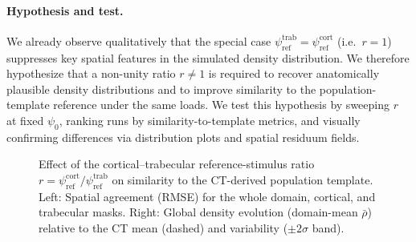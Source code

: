\paragraph{Hypothesis and test.}
We already observe qualitatively that the special case $\psi_{\mathrm{ref}}^{\mathrm{trab}}=\psi_{\mathrm{ref}}^{\mathrm{cort}}$ (i.e.\ $r=1$) suppresses key spatial features in the simulated density distribution.
We therefore hypothesize that a non-unity ratio $r\neq 1$ is required to recover anatomically plausible density distributions and to improve similarity to the population-template reference under the same loads.
We test this hypothesis by sweeping $r$ at fixed $\psi_0$, ranking runs by similarity-to-template metrics, and visually confirming differences via distribution plots and spatial residuum fields.

\begin{figure}[htbp]
  \centering
  \caption{Effect of the cortical--trabecular reference-stimulus ratio $r=\psi_{\mathrm{ref}}^{\mathrm{cort}}/\psi_{\mathrm{ref}}^{\mathrm{trab}}$ on similarity to the CT-derived population template.
  Left: Spatial agreement (RMSE) for the whole domain, cortical, and trabecular masks.
  Right: Global density evolution (domain-mean $\bar\rho$) relative to the CT mean (dashed) and variability ($\pm 2\sigma$ band).
  }
  \label{fig:psi_ref_ratio_analysis}
\end{figure}
